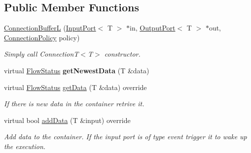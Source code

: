 \subsection*{Public Member Functions}
\begin{DoxyCompactItemize}
\item 
\hypertarget{classcoco_1_1_connection_buffer_l_af15b0bc37247b71bef3b272b2c3aae8d}{\hyperlink{classcoco_1_1_connection_buffer_l_af15b0bc37247b71bef3b272b2c3aae8d}{Connection\-Buffer\-L} (\hyperlink{classcoco_1_1_input_port}{Input\-Port}$<$ T $>$ $\ast$in, \hyperlink{classcoco_1_1_output_port}{Output\-Port}$<$ T $>$ $\ast$out, \hyperlink{structcoco_1_1_connection_policy}{Connection\-Policy} policy)}\label{classcoco_1_1_connection_buffer_l_af15b0bc37247b71bef3b272b2c3aae8d}

\begin{DoxyCompactList}\small\item\em Simply call Connection\-T$<$\-T$>$ constructor. \end{DoxyCompactList}\item 
\hypertarget{classcoco_1_1_connection_buffer_l_a8619c883cd8777a51ed52ddee3693968}{virtual \hyperlink{namespacecoco_a057be58377e415c9be98c1dc5c8426ad}{Flow\-Status} {\bfseries get\-Newest\-Data} (T \&data)}\label{classcoco_1_1_connection_buffer_l_a8619c883cd8777a51ed52ddee3693968}

\item 
\hypertarget{classcoco_1_1_connection_buffer_l_a54f7cf59bbf27a4ce0beee0c231c0bf9}{virtual \hyperlink{namespacecoco_a057be58377e415c9be98c1dc5c8426ad}{Flow\-Status} \hyperlink{classcoco_1_1_connection_buffer_l_a54f7cf59bbf27a4ce0beee0c231c0bf9}{get\-Data} (T \&data) override}\label{classcoco_1_1_connection_buffer_l_a54f7cf59bbf27a4ce0beee0c231c0bf9}

\begin{DoxyCompactList}\small\item\em If there is new data in the container retrive it. \end{DoxyCompactList}\item 
\hypertarget{classcoco_1_1_connection_buffer_l_a0f719a13d365fb116bce2477940bdb2e}{virtual bool \hyperlink{classcoco_1_1_connection_buffer_l_a0f719a13d365fb116bce2477940bdb2e}{add\-Data} (T \&input) override}\label{classcoco_1_1_connection_buffer_l_a0f719a13d365fb116bce2477940bdb2e}

\begin{DoxyCompactList}\small\item\em Add data to the container. If the input port is of type event trigger it to wake up the execution. \end{DoxyCompactList}\end{DoxyCompactItemize}
